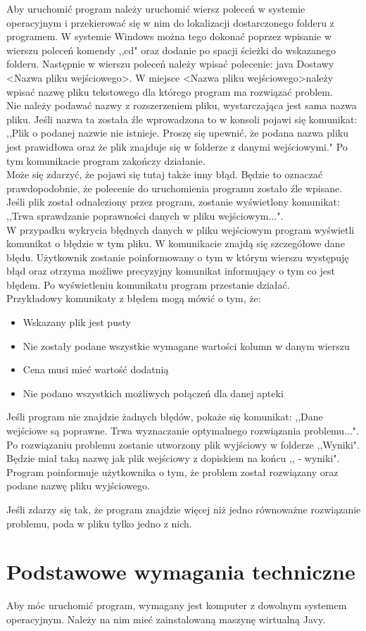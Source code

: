 \documentclass[12pt]{article}
\begin{document}
\quad Aby uruchomić program należy uruchomić wiersz poleceń w systemie operacyjnym i przekierować się w nim do lokalizacji dostarczonego folderu z programem. W systemie Windows można tego dokonać poprzez  wpisanie w wierszu poleceń komendy ,,cd" oraz dodanie po spacji ścieżki do wskazanego folderu. Następnie w wierszu poleceń należy wpisać polecenie: java Dostawy \textless Nazwa pliku wejściowego\textgreater. W miejsce \textless Nazwa pliku wejściowego\textgreater należy wpisać nazwę pliku tekstowego dla którego program ma rozwiązać problem. \\
Nie należy podawać nazwy z rozszerzeniem pliku, wystarczająca jest sama nazwa pliku. Jeśli nazwa ta została źle wprowadzona to w konsoli pojawi się komunikat: ,,Plik o podanej nazwie nie istnieje. Proszę się upewnić, że podana nazwa pliku jest prawidłowa oraz że plik znajduje się w folderze z danymi wejściowymi." Po tym komunikacie program zakończy działanie. \\
Może się zdarzyć, że pojawi się tutaj także inny błąd. Będzie to oznaczać prawdopodobnie, że polecenie do uruchomienia programu zostało źle wpisane.
Jeśli plik został odnaleziony przez program, zostanie wyświetlony komunikat: ,,Trwa sprawdzanie poprawności danych w pliku wejściowym...". \\
\qquad W przypadku wykrycia błędnych danych w pliku wejściowym program wyświetli komunikat o błędzie w tym pliku. W komunikacie znajdą się szczegółowe dane błędu. Użytkownik zostanie poinformowany o tym w którym wierszu występuję błąd oraz otrzyma możliwe precyzyjny komunikat informujący o tym co jest błędem. Po wyświetleniu komunikatu program przestanie działać.\\
Przykładowy komunikaty z błędem mogą mówić o tym, że: 
\begin{itemize}
  \item Wskazany plik jest pusty
  \item Nie zostały podane wszystkie wymagane wartości kolumn w danym wierszu
  \item Cena musi mieć wartość dodatnią
  \item Nie podano wszystkich możliwych połączeń dla danej apteki
\end{itemize}

Jeśli program nie znajdzie żadnych błędów, pokaże się komunikat: ,,Dane wejściowe są poprawne. Trwa wyznaczanie optymalnego rozwiązania problemu...". \\
Po rozwiązaniu problemu zostanie utworzony plik wyjściowy w folderze ,,Wyniki". Będzie miał taką nazwę jak plik wejściowy z dopiskiem na końcu ,, - wyniki". Program poinformuje użytkownika o tym, że problem został rozwiązany oraz podane nazwę pliku wyjściowego.

\qquad Jeśli zdarzy się tak, że program znajdzie więcej niż jedno równoważne rozwiązanie problemu, poda w pliku tylko jedno z nich.

\section{Podstawowe wymagania techniczne}
\qquad Aby móc uruchomić program, wymagany jest komputer z dowolnym systemem operacyjnym. Należy na nim mieć zainstalowaną maszynę wirtualną Javy.
\end{document}
